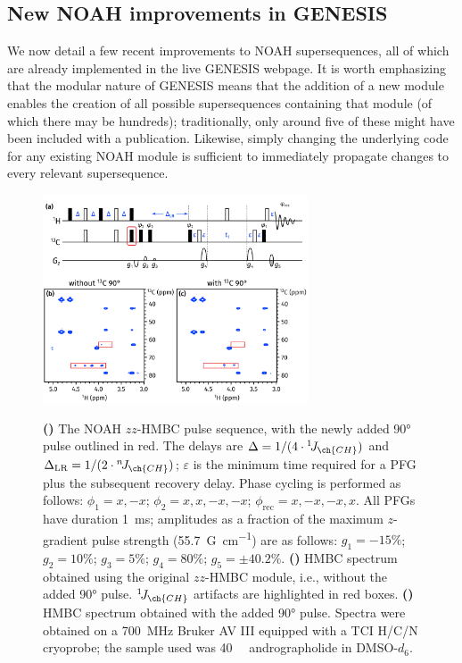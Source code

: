 \documentclass[a4paper,11pt]{article}
\newcommand{\carbon}{\ch{^{13}C}}
\newcommand{\onejch}{{}^1\!J_{\ch{CH}}}
\newcommand{\njch}{{}^n\!J_{\ch{CH}}}
\newcommand*{\andro}{Spectra were obtained on a \SI{700}{\MHz} Bruker AV III equipped with a TCI H/C/N cryoprobe; the sample used was \SI{40}{\milli\molar} andrographolide in DMSO-\(d_6\).}
\begin{document}
\begin{refsection}
\section{New NOAH improvements in GENESIS}

We now detail a few recent improvements to NOAH supersequences, all of which are already implemented in the live GENESIS webpage.
It is worth emphasizing that the modular nature of GENESIS means that the addition of a new module enables the creation of all possible supersequences containing that module (of which there may be hundreds); traditionally, only around five of these might have been included with a publication.
Likewise, simply changing the underlying code for any existing NOAH module is sufficient to immediately propagate changes to every relevant supersequence.

\begin{figure}[ht]
    \centering
    \includegraphics[width=0.7\textwidth]{hmbc_comp.png}
    {\label{fig:hmbc_comp_pulprog}}
    {\label{fig:hmbc_comp_before}}
    {\label{fig:hmbc_comp_after}}
    \caption{
        \textbf{()} The NOAH \(zz\)-HMBC pulse sequence, with the newly added \carbon{} \ang{90} pulse outlined in red.
        The delays are \(\Delta = 1/(4 \cdot \onejch)\) and \(\Delta_{\text{LR}} = 1/(2 \cdot \njch)\); \(\varepsilon\) is the minimum time required for a PFG plus the subsequent recovery delay.
        Phase cycling is performed as follows: \(\phi_1 = x, -x\); \(\phi_2 = x, x, -x, -x\); \(\phi_{\text{rec}} = x, -x, -x, x\).
        All PFGs have duration \SI{1}{ms}; amplitudes as a fraction of the maximum \(z\)-gradient pulse strength (\SI{55.7}{G\per\cm}) are as follows: \(g_1 = -15\%\); \(g_2 = 10\%\); \(g_3 = 5\%\); \(g_4 = 80\%\); \(g_5 = \pm 40.2\%\).
        \textbf{()} HMBC spectrum obtained using the original \(zz\)-HMBC module, i.e., without the added \ang{90} pulse.
        \(\onejch{}\) artifacts are highlighted in red boxes.
        \textbf{()} HMBC spectrum obtained with the added \ang{90} pulse.
        \andro{}
    }
    \label{fig:hmbc_comp}
\end{figure}


\end{refsection}
\end{document}
